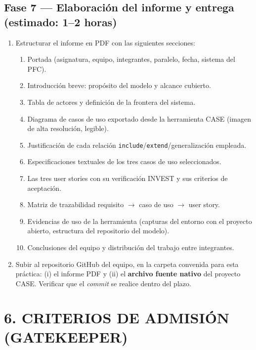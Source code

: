 \documentclass[11pt]{article}
\begin{document}
\subsection*{\textcolor{midblue}{Fase 7 --- Elaboración del informe y entrega (estimado: 1--2 horas)}}
\begin{enumerate}[leftmargin=18pt,itemsep=2pt]
  \item Estructurar el informe en PDF con las siguientes secciones:
    \begin{enumerate}[leftmargin=16pt,itemsep=1pt,label=\alph*)]
      \item Portada (asignatura, equipo, integrantes, paralelo, fecha, sistema del PFC).
      \item Introducción breve: propósito del modelo y alcance cubierto.
      \item Tabla de actores y definición de la frontera del sistema.
      \item Diagrama de casos de uso exportado desde la herramienta CASE (imagen de alta resolución, legible).
      \item Justificación de cada relación \texttt{include}/\texttt{extend}/generalización empleada.
      \item Especificaciones textuales de los tres casos de uso seleccionados.
      \item Las tres user stories con su verificación INVEST y sus criterios de aceptación.
      \item Matriz de trazabilidad requisito $\rightarrow$ caso de uso $\rightarrow$ user story.
      \item Evidencias de uso de la herramienta (capturas del entorno con el proyecto abierto, estructura del repositorio del modelo).
      \item Conclusiones del equipo y distribución del trabajo entre integrantes.
    \end{enumerate}
  \item Subir al repositorio GitHub del equipo, en la carpeta convenida para esta práctica: (i) el informe PDF y (ii) el \textbf{archivo fuente nativo} del proyecto CASE. Verificar que el \textit{commit} se realice dentro del plazo.
\end{enumerate}

\section*{\textcolor{utegreendk}{6. CRITERIOS DE ADMISIÓN (GATEKEEPER)}}
\end{document}
